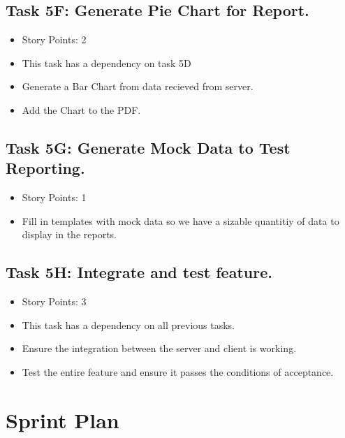 \documentclass[12pt]{article}
\begin{document}
\subsection{Task 5F: Generate Pie Chart for Report.}
\begin{itemize}%
\item Story Points: 2
\item This task has a dependency on task 5D
\item Generate a Bar Chart from data recieved from server.
\item Add the Chart to the PDF.
\end{itemize}

\subsection{Task 5G: Generate Mock Data to Test Reporting.}
\begin{itemize}%
\item Story Points: 1
\item Fill in templates with mock data so we have a sizable quantitiy of data to display in the reports.
\end{itemize}

\subsection{Task 5H: Integrate and test feature.}
\begin{itemize}%
\item Story Points: 3
\item This task has a dependency on all previous tasks.
\item Ensure the integration between the server and client is working.
\item Test the entire feature and ensure it passes the conditions of acceptance.
\end{itemize}

\newpage
\section{Sprint Plan}
\end{document}
